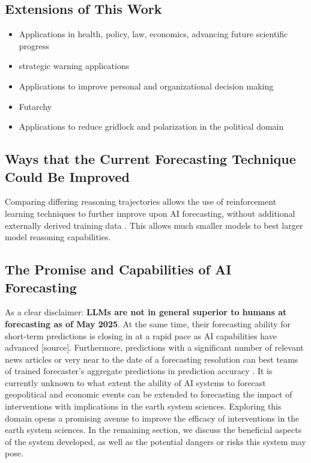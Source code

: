 \documentclass[12pt,a4paper]{article}
\begin{document}
\subsection{Extensions of This Work}
\begin{itemize}
  \item Applications in health, policy, law, economics, advancing future scientific progress
  \item strategic warning applications 
  \item Applications to improve personal and organizational decision making
  \item Futarchy   
  \item Applications to reduce gridlock and polarization in the political domain
\end{itemize}
\subsection{Ways that the Current Forecasting Technique Could Be Improved}
Comparing differing reasoning trajectories allows the use of reinforcement learning techniques to further improve upon AI forecasting, without additional externally derived training data . This allows much smaller models to best larger model reasoning capabilities.


\subsection{The Promise and Capabilities of AI Forecasting}

As a clear disclaimer: \textbf{LLMs are not in general superior to humans at forecasting as of May 2025}. At the same time, their forecasting ability for short-term predictions is closing in at a rapid pace as AI capabilities have advanced [source]. Furthermore, predictions with a significant number of relevant news articles or very near to the date of a forecasting resolution can best teams of trained forecaster's aggregate predictions in prediction accuracy . It is currently unknown to what extent the ability of AI systems to forecast geopolitical and economic events can be extended to forecasting the impact of interventions with implications in the earth system sciences. Exploring this domain opens a promising avenue to improve the efficacy of interventions in the earth system sciences. In the remaining section, we discuss the beneficial aspects of the system developed, as well as the potential dangers or risks this system may pose.
\end{document}
